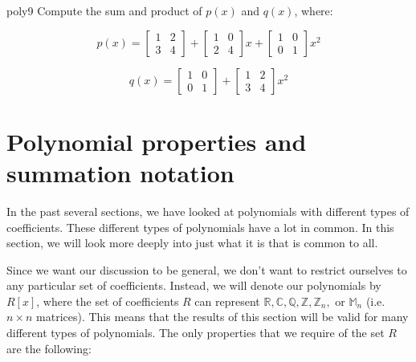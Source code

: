 \begin{exercise}{poly9}
Compute the sum and product of $p(x)$ and $q(x)$, where:

$$p(x)=  \begin{bmatrix} 
1 & 2 \\
3 & 4 
\end{bmatrix}
+\begin{bmatrix} 
1 & 0 \\
2 & 4 
\end{bmatrix}
 x+\begin{bmatrix} 
1 & 0 \\
0 & 1 
\end{bmatrix}
 x^2$$

$$q(x)=  \begin{bmatrix} 
1 & 0 \\
0 & 1 
\end{bmatrix}
+\begin{bmatrix} 
1 & 2 \\
3 & 4 
\end{bmatrix}
 x^2$$
\end{exercise}

\section{ Polynomial properties and summation notation}
\label{polycoefficients}

In the past several sections, we have looked at polynomials with different types of coefficients. These different types of polynomials have a lot in common. In this section, we will look more deeply into just what it is that is common to all. 

Since we want our discussion to be general, we don't want to restrict ourselves to any particular set of coefficients.  Instead, we will denote our polynomials by $R[x]$, where the set of coefficients $R$  can represent ${\mathbb R},{\mathbb C},{\mathbb Q},{\mathbb Z},{\mathbb Z}_n,$ or ${\mathbb M}_n$ (i.e. $n \times n$ matrices). This means that the results of this section will be valid for many different types of polynomials.  The only properties that we require of the set $R$ are the following:

